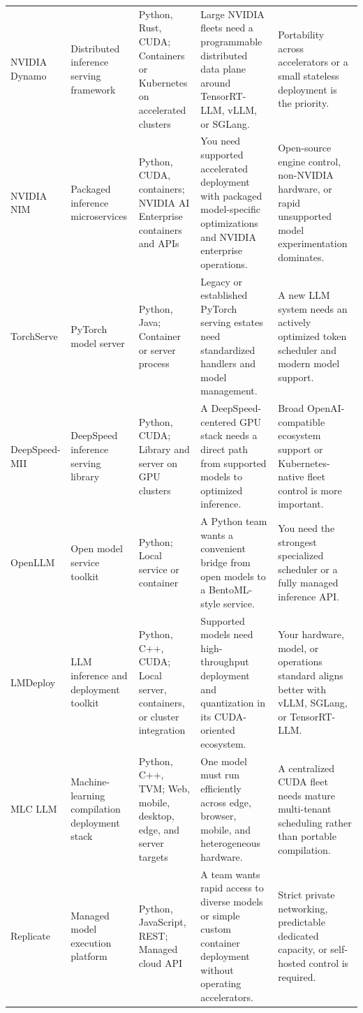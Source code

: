 \begin{longtable}{@{}p{20mm}p{22mm}p{26mm}p{46mm}p{46mm}@{}}
NVIDIA Dynamo & Distributed inference serving framework & Python, Rust, CUDA; Containers or Kubernetes on accelerated clusters & Large NVIDIA fleets need a programmable distributed data plane around TensorRT-LLM, vLLM, or SGLang. & Portability across accelerators or a small stateless deployment is the priority.\\
NVIDIA NIM & Packaged inference microservices & Python, CUDA, containers; NVIDIA AI Enterprise containers and APIs & You need supported accelerated deployment with packaged model-specific optimizations and NVIDIA enterprise operations. & Open-source engine control, non-NVIDIA hardware, or rapid unsupported model experimentation dominates.\\
TorchServe & PyTorch model server & Python, Java; Container or server process & Legacy or established PyTorch serving estates need standardized handlers and model management. & A new LLM system needs an actively optimized token scheduler and modern model support.\\
DeepSpeed-MII & DeepSpeed inference serving library & Python, CUDA; Library and server on GPU clusters & A DeepSpeed-centered GPU stack needs a direct path from supported models to optimized inference. & Broad OpenAI-compatible ecosystem support or Kubernetes-native fleet control is more important.\\
OpenLLM & Open model service toolkit & Python; Local service or container & A Python team wants a convenient bridge from open models to a BentoML-style service. & You need the strongest specialized scheduler or a fully managed inference API.\\
LMDeploy & LLM inference and deployment toolkit & Python, C++, CUDA; Local server, containers, or cluster integration & Supported models need high-throughput deployment and quantization in its CUDA-oriented ecosystem. & Your hardware, model, or operations standard aligns better with vLLM, SGLang, or TensorRT-LLM.\\
MLC LLM & Machine-learning compilation deployment stack & Python, C++, TVM; Web, mobile, desktop, edge, and server targets & One model must run efficiently across edge, browser, mobile, and heterogeneous hardware. & A centralized CUDA fleet needs mature multi-tenant scheduling rather than portable compilation.\\
Replicate & Managed model execution platform & Python, JavaScript, REST; Managed cloud API & A team wants rapid access to diverse models or simple custom container deployment without operating accelerators. & Strict private networking, predictable dedicated capacity, or self-hosted control is required.\\

\end{longtable}
